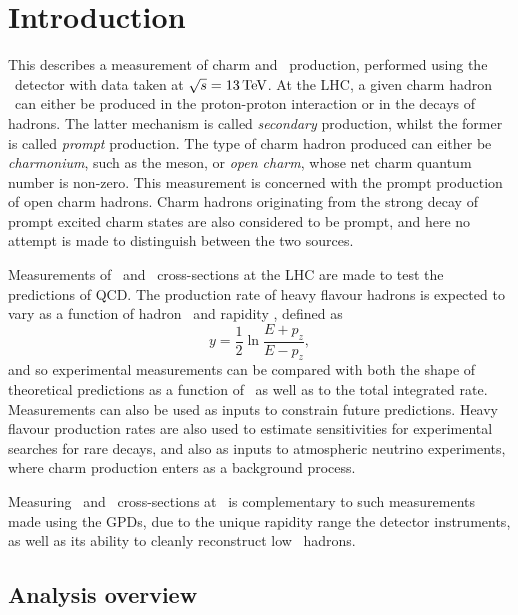 \chapter{Introduction}
\label{chap:prod:introduction}

This  describes a measurement of charm and \ccbar\ 
production, performed using the \lhcb\ detector with data taken at $\sqrts = 
\SI{13}{\TeV}$.
At the \ac{LHC}, a given charm hadron \PHc\ can either be produced in the 
proton-proton interaction or in the decays of \PB hadrons.
The latter mechanism is called \emph{secondary} production, whilst the former is called \emph{prompt} production.
The type of charm hadron produced can either be \emph{charmonium}, such as the 
\PJpsi meson, or \emph{open charm}, whose net charm quantum number is non-zero.
This measurement is concerned with the prompt production of open charm hadrons.
Charm hadrons originating from the strong decay of prompt excited charm states 
are also considered to be prompt, and here no attempt is made to distinguish 
between the two sources.

Measurements of \ccbar\ and \bbbar\ cross-sections at the \ac{LHC} are made to 
test the predictions of \acf{QCD}.
The production rate of heavy flavour hadrons is expected to vary as a function 
of hadron \pT\ and rapidity \rapidity, defined as
\begin{equation}
  y = \frac{1}{2}\ln{\frac{E + p_{z}}{E - p_{z}}},
  \label{eqn:prod:introduction:rapidity}
\end{equation}
and so experimental measurements can be compared with both the shape of 
theoretical predictions as a function of \pTy\ as well as to the total 
integrated rate.
Measurements can also be used as inputs to constrain future predictions.
Heavy flavour production rates are also used to estimate sensitivities for experimental searches 
for rare decays, and also as inputs to 
atmospheric neutrino experiments, where charm production enters as a background 
process.

Measuring \ccbar\ and \bbbar\ cross-sections at \lhcb\ is complementary to such 
measurements made using the \acp{GPD}, due to the unique rapidity range the 
detector instruments, as well as its ability to cleanly reconstruct low \pT\ 
hadrons.

\section{Analysis overview}
\label{chap:prod:introduction:analysis_overview}


